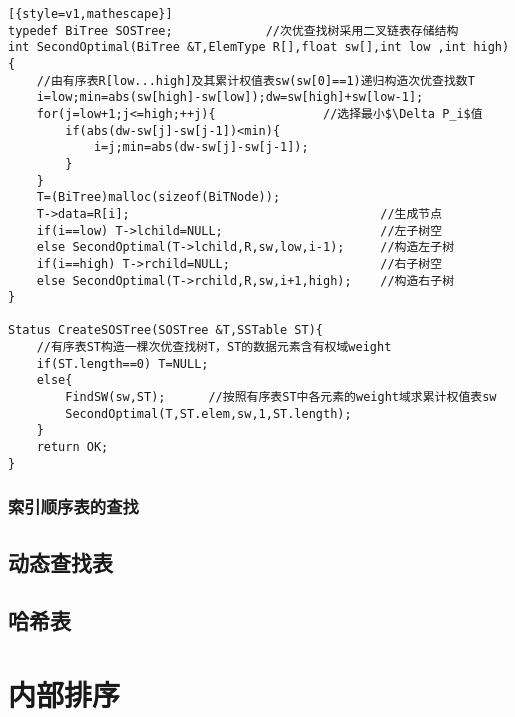 \documentclass[UTF8]{ctexart}
\begin{document}
\begin{lstlisting}[{style=v1,mathescape}]
typedef BiTree SOSTree;             //次优查找树采用二叉链表存储结构
int SecondOptimal(BiTree &T,ElemType R[],float sw[],int low ,int high){
    //由有序表R[low...high]及其累计权值表sw(sw[0]==1)递归构造次优查找数T
    i=low;min=abs(sw[high]-sw[low]);dw=sw[high]+sw[low-1];
    for(j=low+1;j<=high;++j){               //选择最小$\Delta P_i$值
        if(abs(dw-sw[j]-sw[j-1])<min){
            i=j;min=abs(dw-sw[j]-sw[j-1]);
        }
    }
    T=(BiTree)malloc(sizeof(BiTNode));
    T->data=R[i];                                   //生成节点
    if(i==low) T->lchild=NULL;                      //左子树空
    else SecondOptimal(T->lchild,R,sw,low,i-1);     //构造左子树   
    if(i==high) T->rchild=NULL;                     //右子树空
    else SecondOptimal(T->rchild,R,sw,i+1,high);    //构造右子树    
}

Status CreateSOSTree(SOSTree &T,SSTable ST){
    //有序表ST构造一棵次优查找树T，ST的数据元素含有权域weight
    if(ST.length==0) T=NULL;
    else{
        FindSW(sw,ST);      //按照有序表ST中各元素的weight域求累计权值表sw
        SecondOptimal(T,ST.elem,sw,1,ST.length);
    }
    return OK;
}

\end{lstlisting}





\subsubsection{索引顺序表的查找}











\subsection{动态查找表}
\subsection{哈希表}





\newpage
\section{内部排序}
\end{document}
